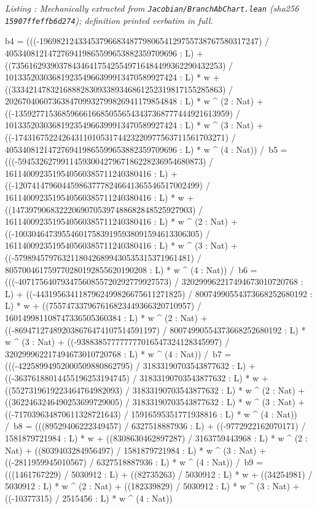\documentclass[a4paper,11pt]{article}
\newcounter{leanlisting}
\newenvironment{leanlisting}[2]{%
  \refstepcounter{leanlisting}\label{#2}%
  \begin{center}\textit{\small Listing \theleanlisting: #1}\end{center}%
  \Verbatim[breaklines=true,breakanywhere=true,fontsize=\footnotesize,frame=single,framesep=4pt,rulecolor=\color{gray!50},fillcolor=\color{gray!5}]%
}{%
  \endVerbatim%
}
\theoremstyle{plain}
\theoremstyle{definition}
\theoremstyle{remark}
\begin{document}
\begin{leanlisting}{Mechanically extracted from \texttt{Jacobian/BranchAbChart.lean} (sha256 \texttt{15907ffeffb6d274}); definition printed verbatim in full.}{lst:def-chartclass}
      b4 = (((-196982124334537966834877980654129755738767580317247) / 4053408121472769419865599653882359709696 : L) + ((7356162939037843464175425549716484499362290432253) / 1013352030368192354966399913470589927424 : L) * w + ((3334214783216888283093389346861252319817155285863) / 2026704060736384709932799826941179854848 : L) * w ^ (2 : Nat) + ((-13592771536859666166850556543437368777444921613959) / 1013352030368192354966399913470589927424 : L) * w ^ (3 : Nat) + ((-1743167522426431101053174423220977563711561703271) / 4053408121472769419865599653882359709696 : L) * w ^ (4 : Nat)) /\
      b5 = (((-5945326279911459300427967186228236954680873) / 1611400923519540560385711240380416 : L) + ((-1207414796044598637778246641365546517002499) / 1611400923519540560385711240380416 : L) * w + ((147397906832220690705397488682848525927903) / 1611400923519540560385711240380416 : L) * w ^ (2 : Nat) + ((-1003046473955460175839195938091594613306305) / 1611400923519540560385711240380416 : L) * w ^ (3 : Nat) + ((-57989457976321180426899430535315371961481) / 805700461759770280192855620190208 : L) * w ^ (4 : Nat)) /\
      b6 = (((-40717564079347560855720292779927573) / 320299962217494673010720768 : L) + ((-4431956341187962499826675611271825) / 80074990554373668252680192 : L) * w + ((755747337967616823449366320710957) / 160149981108747336505360384 : L) * w ^ (2 : Nat) + ((-869471274892038676474107514591197) / 80074990554373668252680192 : L) * w ^ (3 : Nat) + ((-938838577777777016547324128345997) / 320299962217494673010720768 : L) * w ^ (4 : Nat)) /\
      b7 = (((-42258994952000509880862795) / 31833190703543877632 : L) + ((-36376188014455196253194745) / 31833190703543877632 : L) * w + ((5527319619223464764982093) / 31833190703543877632 : L) * w ^ (2 : Nat) + ((3622463246490253699729005) / 31833190703543877632 : L) * w ^ (3 : Nat) + ((-717039634870611328721643) / 15916595351771938816 : L) * w ^ (4 : Nat)) /\
      b8 = (((89529406222349457) / 6327518887936 : L) + ((-9772922162070171) / 1581879721984 : L) * w + ((8308630462897287) / 3163759443968 : L) * w ^ (2 : Nat) + ((8039403284956497) / 1581879721984 : L) * w ^ (3 : Nat) + ((-2811959945010567) / 6327518887936 : L) * w ^ (4 : Nat)) /\
      b9 = (((1461767229) / 5030912 : L) + ((82735263) / 5030912 : L) * w + ((34254981) / 5030912 : L) * w ^ (2 : Nat) + ((182339829) / 5030912 : L) * w ^ (3 : Nat) + ((-10377315) / 2515456 : L) * w ^ (4 : Nat))
\end{leanlisting}
\end{document}
